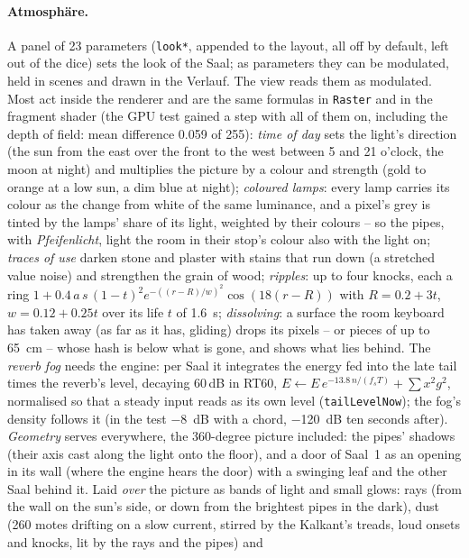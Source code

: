 \documentclass[11pt,a4paper,parskip=half,DIV=11,toc=bibliography]{scrartcl}
\newcommand{\ui}[1]{\emph{#1}}                 %
\newcommand{\fn}[1]{\mbox{\texttt{#1}}}
\begin{document}
\paragraph{Atmosphäre.} A panel of 23 parameters (\fn{look*}, appended to the layout, all off by default, left out of the dice) sets the look
of the Saal; as parameters they can be modulated, held in scenes and drawn in the Verlauf. The view reads them as modulated.
Most act inside the renderer and are the same formulas in \fn{Raster} and in the fragment shader (the GPU test gained a step with all of them on,
including the depth of field: mean difference 0.059 of 255):
\emph{time of day} sets the light's direction (the sun from the east over the front to the west between 5 and 21 o'clock, the moon at night)
and multiplies the picture by a colour and strength (gold to orange at a low sun, a dim blue at night); \emph{coloured lamps}: every lamp carries
its colour as the change from white of the same luminance, and a pixel's grey is tinted by the lamps' share of its light, weighted by their
colours -- so the pipes, with \ui{Pfeifenlicht}, light the room in their stop's colour also with the light on; \emph{traces of use} darken stone
and plaster with stains that run down (a stretched value noise) and strengthen the grain of wood; \emph{ripples}: up to four knocks, each a ring
$1 + 0.4\,a\,s\,(1-t)^2 e^{-((r-R)/w)^2}\cos(18(r-R))$ with $R = 0.2 + 3t$, $w = 0.12 + 0.25t$ over its life $t$ of \SI{1.6}{s};
\emph{dissolving}: a surface the room keyboard has taken away (as far as it has, gliding) drops its pixels -- or pieces of up to \SI{65}{cm} --
whose hash is below what is gone, and shows what lies behind. The \emph{reverb fog} needs the engine: per Saal it integrates the energy fed into
the late tail times the reverb's level, decaying 60\,dB in RT60, $E \leftarrow E\,e^{-13.8\,n/(f_s T)} + \sum x^2 g^2$, normalised so that a
steady input reads as its own level (\fn{tailLevelNow}); the fog's density follows it (in the test \SI{-8}{dB} with a chord, \SI{-120}{dB} ten
seconds after). \emph{Geometry} serves everywhere, the 360-degree picture included: the pipes' shadows (their axis cast along the light onto
the floor), and a door of Saal~1 as an opening in its wall (where the engine hears the door) with a swinging leaf and the other Saal behind it.
Laid \emph{over} the picture as bands of light and small glows: rays (from the wall on the sun's side, or down from the brightest pipes in the
dark), dust (260 motes drifting on a slow current, stirred by the Kalkant's treads, loud onsets and knocks, lit by the rays and the pipes) and
\end{document}
